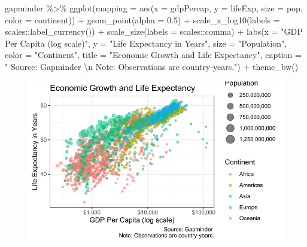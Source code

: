 \documentclass[
  letterpaper,
]{book}
\newenvironment{Shaded}{\begin{snugshade}}{\end{snugshade}}
\newcommand{\AttributeTok}[1]{\textcolor[rgb]{0.40,0.45,0.13}{#1}}
\newcommand{\FloatTok}[1]{\textcolor[rgb]{0.68,0.00,0.00}{#1}}
\newcommand{\FunctionTok}[1]{\textcolor[rgb]{0.28,0.35,0.67}{#1}}
\newcommand{\NormalTok}[1]{\textcolor[rgb]{0.00,0.23,0.31}{#1}}
\newcommand{\SpecialCharTok}[1]{\textcolor[rgb]{0.37,0.37,0.37}{#1}}
\newcommand{\StringTok}[1]{\textcolor[rgb]{0.13,0.47,0.30}{#1}}
\begin{document}
\begin{Shaded}
\begin{Highlighting}[]
\NormalTok{gapminder }\SpecialCharTok{\%\textgreater{}\%}
  \FunctionTok{ggplot}\NormalTok{(}\AttributeTok{mapping =} \FunctionTok{aes}\NormalTok{(}\AttributeTok{x =}\NormalTok{ gdpPercap, }
                       \AttributeTok{y =}\NormalTok{ lifeExp,}
                       \AttributeTok{size =}\NormalTok{ pop,}
                       \AttributeTok{color =}\NormalTok{ continent)) }\SpecialCharTok{+}
  \FunctionTok{geom\_point}\NormalTok{(}\AttributeTok{alpha =} \FloatTok{0.5}\NormalTok{) }\SpecialCharTok{+} 
  \FunctionTok{scale\_x\_log10}\NormalTok{(}\AttributeTok{labels =}\NormalTok{ scales}\SpecialCharTok{::}\FunctionTok{label\_currency}\NormalTok{()) }\SpecialCharTok{+}
  \FunctionTok{scale\_size}\NormalTok{(}\AttributeTok{labels =}\NormalTok{ scales}\SpecialCharTok{::}\NormalTok{comma) }\SpecialCharTok{+}
  \FunctionTok{labs}\NormalTok{(}\AttributeTok{x =} \StringTok{"GDP Per Capita (log scale)"}\NormalTok{,}
       \AttributeTok{y =} \StringTok{"Life Expectancy in Years"}\NormalTok{,}
       \AttributeTok{size =} \StringTok{"Population"}\NormalTok{,}
       \AttributeTok{color =} \StringTok{"Continent"}\NormalTok{,}
       \AttributeTok{title =} \StringTok{"Economic Growth and Life Expectancy"}\NormalTok{,}
       \AttributeTok{caption =} \StringTok{" Source: Gapminder }\SpecialCharTok{\textbackslash{}n}\StringTok{ Note: Observations are country{-}years."}\NormalTok{) }\SpecialCharTok{+}
  \FunctionTok{theme\_bw}\NormalTok{()}
\end{Highlighting}
\end{Shaded}

\begin{figure}[H]

{\centering \includegraphics{visualizing-with-ggplot_files/figure-pdf/unnamed-chunk-26-1.pdf}

}

\end{figure}
\end{document}
